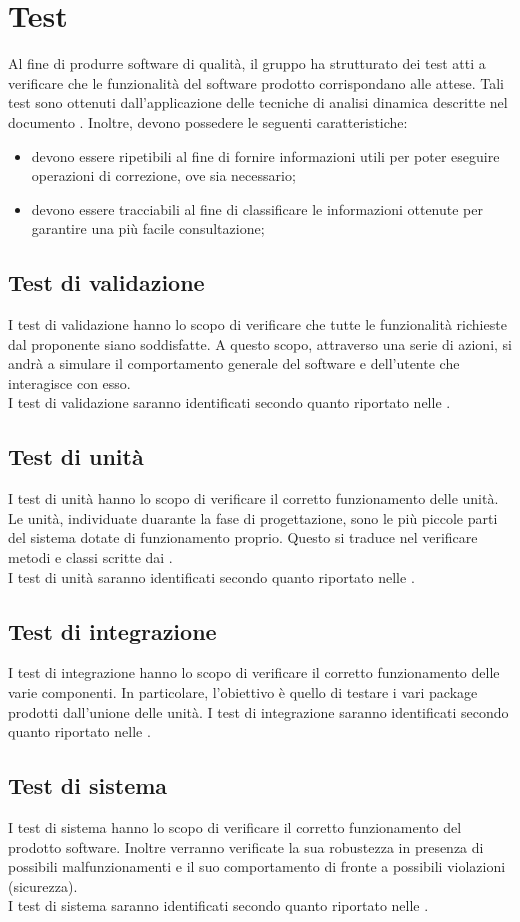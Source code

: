 \documentclass[PianoDiQualifica.tex]{subfiles}
\begin{document}
\section{Test}
Al fine di produrre software di qualità, il gruppo ha strutturato dei test atti a verificare che le funzionalità del software prodotto corrispondano alle attese.
Tali test sono ottenuti dall'applicazione delle tecniche di analisi dinamica descritte nel documento \NPdocRP{}. Inoltre, devono possedere le seguenti caratteristiche:
\begin{itemize}
	\item devono essere ripetibili al fine di fornire informazioni utili per poter eseguire operazioni di correzione, ove sia necessario;
	\item devono essere tracciabili al fine di classificare le informazioni ottenute per garantire una più facile consultazione;
\end{itemize}

	\subsection{Test di validazione}
		I test di validazione hanno lo scopo di verificare che tutte le funzionalità richieste dal proponente siano soddisfatte. A questo scopo, attraverso una serie di
		azioni, si andrà a simulare il comportamento generale del software e dell'utente che interagisce con esso. \\
		I test di validazione saranno identificati secondo quanto riportato nelle \NPdocRP{}.
	
	\subsection{Test di unità}
		I test di unità hanno lo scopo di verificare il corretto funzionamento delle unità. Le unità, individuate duarante la fase di progettazione, sono le
		più piccole parti del sistema dotate di funzionamento proprio. Questo si traduce nel verificare metodi e classi scritte dai \PRP{}. \\
		I test di unità saranno identificati secondo quanto riportato nelle \NPdocRP{}.
	
	\subsection{Test di integrazione}
		I test di integrazione hanno lo scopo di verificare il corretto funzionamento delle varie componenti. In particolare, l'obiettivo è quello di testare i vari
		package prodotti dall'unione delle unità.
		I test di integrazione saranno identificati secondo quanto riportato nelle \NPdocRP{}.
	
	\subsection{Test di sistema}
		I test di sistema hanno lo scopo di verificare il corretto funzionamento del prodotto software. Inoltre verranno verificate la sua robustezza in presenza di
		possibili malfunzionamenti e il suo comportamento di fronte a possibili violazioni (sicurezza). \\
		I test di sistema saranno identificati secondo quanto riportato nelle \NPdocRP{}.
\end{document}
